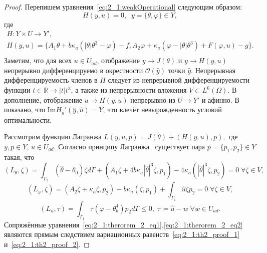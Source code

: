\begin{proof}
    Перепишем уравнения~\eqref{eq:2_1:weakOperational} следующим образом:
    \[ H(y,u) = 0,\;\; y = \{\theta,\varphi\} \in Y, \]
    где
    \begin{gather*}
        H:Y \times U \to Y',\\
        H(y,u) =\{A_1 \theta + b \kappa_a (| \theta | \theta^3 - \varphi ) - f,
        A_2 \varphi + \kappa_a (\varphi - |\theta|\theta^3) + F(\varphi, u) - g \}.\\
    \end{gather*}
    Заметим, что для всех $u \in U_{ad}$, отображение $y \to J(\theta) $ и $y \to H(y,u)$ непрерывно
    дифференцируемо в окрестности $\mathcal{O}(\hat{y})$ точки $\hat{y}$.
    Непрерывная дифференцируемость членов в $H$ следует из непрерывной дифференцируемости
    функции $t \in \mathbb{R} \to | t | t^3$, а также из непрерывности вложения  $V \subset L^6(\Omega)$.
    В дополнение, отображение $u \to H(y,u)$ непрерывно из $U \to Y'$ и афинно.
    В~\cite{Kovtanyuk2014TheoreticalAnalysis} показано, что $\text{Im}H_y'(\hat{y}, \hat{u}) = Y$,
    что влечёт невырожденность условий оптимальности.

    Рассмотрим функцию Лагранжа $L(y,u,p) = J(\theta) + (H(y,u),p),$ где $y,p \in Y,\, u \in U_{ad}$.
    Согласно принципу Лагранжа~\cite[Гл.2, Теорема 1.5]{11}
    существует пара $p = \{p_1,p_2\} \in Y$ такая, что
    \begin{equation}
        \label{eq:2_1:th2_proof_1}
        (L_\theta,\zeta) =\int_{\Gamma_2}(\hat\theta -\theta_0) \zeta d\Gamma
        + (A_1 \zeta + 4b\kappa_a |\hat\theta|^3 \zeta,p_1)
        - 4\kappa_a(|\hat\theta|^3 \zeta,p_2) = 0 \; \forall \zeta \in V,
    \end{equation}
    \begin{equation}
        \label{eq:2_1:th2_proof_2}
        (L_\varphi, \zeta) = (A_2 \zeta + \kappa_a \zeta, p_2)
        - b \kappa_a(\zeta,p_1) +\int_{\Gamma_1} \hat u \zeta p_2 = 0 \; \forall \zeta \in V,
    \end{equation}
    \begin{equation}
        \label{eq:2_1:th2_proof_3}
        (L_u,\tau) = \int_{\Gamma_1} \tau (\varphi - \theta^4_b) p_2 d\Gamma  \leq 0,
        \; \tau \coloneqq \hat u - w \; \forall w \in U_{ad}.
    \end{equation}
    Сопряжённые уравнения~\eqref{eq:2_1:therorem_2_eq1},\eqref{eq:2_1:therorem_2_eq2}
    являются прямым следствием
    вариационных равенств~\eqref{eq:2_1:th2_proof_1} и~\eqref{eq:2_1:th2_proof_2}.
\end{proof}
\FloatBarrier
